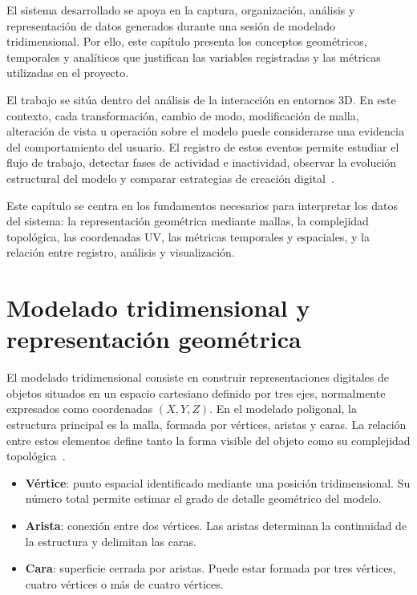 
El sistema desarrollado se apoya en la captura, organización, análisis y representación de datos generados durante una sesión de modelado tridimensional. Por ello, este capítulo presenta los conceptos geométricos, temporales y analíticos que justifican las variables registradas y las métricas utilizadas en el proyecto.

El trabajo se sitúa dentro del análisis de la interacción en entornos 3D. En este contexto, cada transformación, cambio de modo, modificación de malla, alteración de vista u operación sobre el modelo puede considerarse una evidencia del comportamiento del usuario. El registro de estos eventos permite estudiar el flujo de trabajo, detectar fases de actividad e inactividad, observar la evolución estructural del modelo y comparar estrategias de creación digital~\cite{jankowski2014,gao2021,gao2023}.

Este capítulo se centra en los fundamentos necesarios para interpretar los datos del sistema: la representación geométrica mediante mallas, la complejidad topológica, las coordenadas UV, las métricas temporales y espaciales, y la relación entre registro, análisis y visualización.

\section{Modelado tridimensional y representación geométrica}

El modelado tridimensional consiste en construir representaciones digitales de objetos situados en un espacio cartesiano definido por tres ejes, normalmente expresados como coordenadas $(X,Y,Z)$. En el modelado poligonal, la estructura principal es la malla, formada por vértices, aristas y caras. La relación entre estos elementos define tanto la forma visible del objeto como su complejidad topológica~\cite{botsch2010polygon}.

\begin{itemize}
    \item \textbf{Vértice}: punto espacial identificado mediante una posición tridimensional. Su número total permite estimar el grado de detalle geométrico del modelo.
    \item \textbf{Arista}: conexión entre dos vértices. Las aristas determinan la continuidad de la estructura y delimitan las caras.
    \item \textbf{Cara}: superficie cerrada por aristas. Puede estar formada por tres vértices, cuatro vértices o más de cuatro vértices.
\end{itemize}

